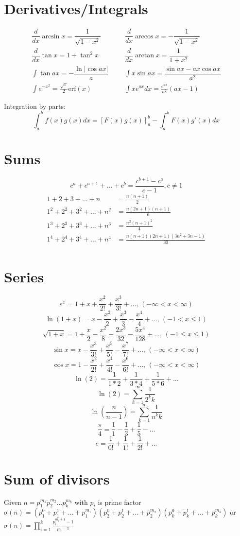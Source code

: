 \section{Derivatives/Integrals}
\begin{align*}
	\dfrac{d}{dx}\arcsin x = \dfrac{1}{\sqrt{1-x^2}} &&& \dfrac{d}{dx}\arccos x = -\dfrac{1}{\sqrt{1-x^2}} \\
	\dfrac{d}{dx}\tan x = 1+\tan^2 x &&& \dfrac{d}{dx}\arctan x = \dfrac{1}{1+x^2} \\
	\int\tan ax = -\dfrac{\ln|\cos ax|}{a} &&& \int x\sin ax = \dfrac{\sin ax-ax \cos ax}{a^2} \\
	\int e^{-x^2} = \frac{\sqrt \pi}{2} \text{erf}(x) &&& \int xe^{ax}dx = \frac{e^{ax}}{a^2}(ax-1)
\end{align*}

Integration by parts:
\[\int_a^bf(x)g(x)dx = [F(x)g(x)]_a^b-\int_a^bF(x)g'(x)dx\]

\section{Sums}
\[ c^a + c^{a+1} + \dots + c^{b} = \frac{c^{b+1} - c^a}{c-1}, c \neq 1 \]
\begin{align*}
	1 + 2 + 3 + \dots + n &= \frac{n(n+1)}{2} \\
	1^2 + 2^2 + 3^2 + \dots + n^2 &= \frac{n(2n+1)(n+1)}{6} \\
	1^3 + 2^3 + 3^3 + \dots + n^3 &= \frac{n^2(n+1)^2}{4} \\
	1^4 + 2^4 + 3^4 + \dots + n^4 &= \frac{n(n+1)(2n+1)(3n^2 + 3n - 1)}{30} \\
\end{align*}

\section{Series}
$$e^x = 1+x+\frac{x^2}{2!}+\frac{x^3}{3!}+\dots,\,(-\infty<x<\infty)$$
$$\ln(1+x) = x-\frac{x^2}{2}+\frac{x^3}{3}-\frac{x^4}{4}+\dots,\,(-1<x\leq1)$$
$$\sqrt{1+x} = 1+\frac{x}{2}-\frac{x^2}{8}+\frac{2x^3}{32}-\frac{5x^4}{128}+\dots,\,(-1\leq x\leq1)$$
$$\sin x = x-\frac{x^3}{3!}+\frac{x^5}{5!}-\frac{x^7}{7!}+\dots,\,(-\infty<x<\infty)$$
$$\cos x = 1-\frac{x^2}{2!}+\frac{x^4}{4!}-\frac{x^6}{6!}+\dots,\,(-\infty<x<\infty)$$
$$\ln(2) = \frac{1}{1*2} + \frac{1}{3*4} + \frac{1}{5*6} + \dots$$
$$\ln(2) = \sum^{\infty}_{k=1}\frac{1}{2^{k}k}$$
$$\ln(\frac{n}{n-1}) = \sum^{\infty}_{k=1}\frac{1}{n^{k}k}$$
$$\frac{\pi}{4} = \frac{1}{1} - \frac{1}{3} + \frac{1}{5} - \dots$$
$$e = \frac{1}{0!} + \frac{1}{1!} + \frac{1}{2!} + \dots$$

\section{Sum of divisors}
Given $n = p^{m_1}_1 \dot p^{m_2}_2 \dots p^{m_k}_k$ with $p_i$ is prime factor
$\sigma(n) = (p^0_1+p^1_1+\dots+p^{m_1}_1)(p^0_2+p^1_2+\dots+p^{m_2}_2)(p^0_k+p^1_k+\dots+p^{m_k}_k)$
or $\sigma(n) = \prod^{k}_{i=1} \frac{p_i^{m_i+1}-1}{p_i-1}$